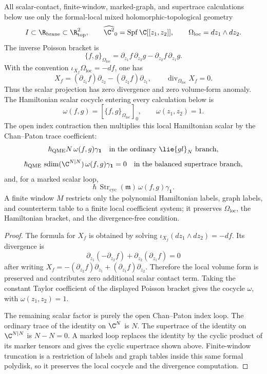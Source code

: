 \begin{prop}
\label{prop:app-local-geometry-scalar-shadow}
  All scalar-contact, finite-window, marked-graph, and supertrace
  calculations below use only the formal-local mixed
  holomorphic-topological geometry
  \[
    I\subset\R_{\mathrm{brane}}\subset\R^2_{\mathrm{top}},
    \qquad
    \widehat{\C^2}_0=\operatorname{Spf}\C[[z_1,z_2]],
    \qquad
    \Omega_{\mathrm{loc}}=dz_1\wedge dz_2 .
  \]
  The inverse Poisson bracket is
  \[
    \{f,g\}_{\Omega_{\mathrm{loc}}}
      =
    \partial_{z_1}f\,\partial_{z_2}g
      -
    \partial_{z_2}f\,\partial_{z_1}g .
  \]
  With the convention
  \(\iota_{X_f}\Omega_{\mathrm{loc}}=-df\), one has
  \[
    X_f=(\partial_{z_1}f)\partial_{z_2}
        -(\partial_{z_2}f)\partial_{z_1},
    \qquad
    \operatorname{div}_{\Omega_{\mathrm{loc}}}X_f=0 .
  \]
  Thus the scalar projection has zero divergence and zero volume-form anomaly.
  The Hamiltonian scalar cocycle entering every calculation
  below is
  \[
    \omega(f,g)
      =
    [\{f,g\}_{\Omega_{\mathrm{loc}}}]_0,
    \qquad
    \omega(z_1,z_2)=1 .
  \]
  The open index contraction then multiplies this local Hamiltonian scalar
  by the Chan--Paton trace coefficient:
  \[
    \hbar_{\mathrm{QME}}N\,\omega(f,g)\gamma_{\mathbf 1}
    \quad\text{in the ordinary }\lie{gl}_N\text{ branch},
  \]
  \[
    \hbar_{\mathrm{QME}}\,\operatorname{sdim}(\C^{N|N})\,
    \omega(f,g)\gamma_{\mathbf 1}=0
    \quad\text{in the balanced supertrace branch},
  \]
  and, for a marked scalar loop,
  \[
    \hbar\,\operatorname{Str}_{\mathrm{cyc}}(\mathfrak m)\,
    \omega(f,g)\gamma_{\mathbf 1}.
  \]
  A finite window \(M\) restricts only the polynomial Hamiltonian labels,
  graph labels, and counterterm table to a finite local coefficient
  system; it preserves
  \(\Omega_{\mathrm{loc}}\), the Hamiltonian bracket, and the
  divergence-free condition.
\end{prop}

\begin{proof}
  The formula for \(X_f\) is obtained by solving
  \(\iota_{X_f}(dz_1\wedge dz_2)=-df\).  Its divergence is
  \[
    \partial_{z_1}(-\partial_{z_2}f)
      +\partial_{z_2}(\partial_{z_1}f)=0
  \]
  after writing \(X_f=-(\partial_{z_2}f)\partial_{z_1}
  +(\partial_{z_1}f)\partial_{z_2}\).  Therefore the local volume form
  is preserved and contributes zero additional scalar contact term.
  Taking the constant Taylor coefficient of the displayed Poisson bracket
  gives the cocycle \(\omega\), with \(\omega(z_1,z_2)=1\).

  The remaining scalar factor is purely the open Chan--Paton index loop.
  The ordinary trace of the identity on \(\C^N\) is \(N\).  The supertrace
  of the identity on \(\C^{N|N}\) is \(N-N=0\).  A marked loop replaces
  the identity by the cyclic product of its marker tensors and gives the
  cyclic supertrace shown above.  Finite-window truncation is a restriction
  of labels and graph tables inside this same formal polydisk, so it preserves
  the local cocycle and the divergence computation.
\end{proof}

